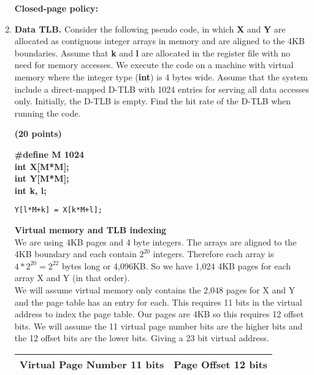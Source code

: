 \documentclass[a4paper, 11pt]{exam}
\begin{document}
\begin{enumerate}
\textbf{Closed-page policy:}

\item \textbf{Data TLB.}
Consider the following  pseudo code, in which \textbf{X} and \textbf{Y} are allocated as contiguous integer arrays in memory and are aligned to the 4KB boundaries.
Assume that \textbf{k} and \textbf{l} are allocated in the register file with no need for memory accesses.
We execute the code on a machine with virtual memory where the integer type (\textbf{int}) is 4 bytes wide.
Assume that the system include a direct-mapped D-TLB with 1024 entries for serving all data accesses only.
Initially, the D-TLB is empty.
Find the hit rate of the D-TLB when running the code.

\textbf{(20 points)}
\begin{algorithm}
	\textbf{\#define M 1024} \\
	\textbf{int X[M*M];} \\
	\textbf{int Y[M*M];} \\
	\textbf{int k, l;}
	\begin{algorithmic}	
		\STATE \texttt{Y[l*M+k] = X[k*M+l];}
		\ENDFOR
		\ENDFOR
	\end{algorithmic}
\end{algorithm}

\textbf{Virtual memory and TLB indexing} \\

We are using 4KB pages and 4 byte integers. The arrays are aligned to the 4KB boundary and each contain $2^{20}$ integers. Therefore each array is $4* 2^{20} = 2^{22}$ bytes long or 4,096KB. So we have 1,024 4KB pages for each array X and Y (in that order). \\

We will assume virtual memory only contains the 2,048 pages for X and Y and the page table has an entry for each. This requires 11 bits in the virtual address to index the page table. Our pages are 4KB so this requires 12 offset bits. We will assume the 11 virtual page number bits are the higher bits and the 12 offset bits are the lower bits. Giving a 23 bit virtual address.

\begin{center}
	\begin{tabular}{|c|c|}
		\hline
		Virtual Page Number 11 bits & Page Offset 12 bits\\
		\hline
	\end{tabular}
\end{center}


\end{enumerate}
\end{document}
